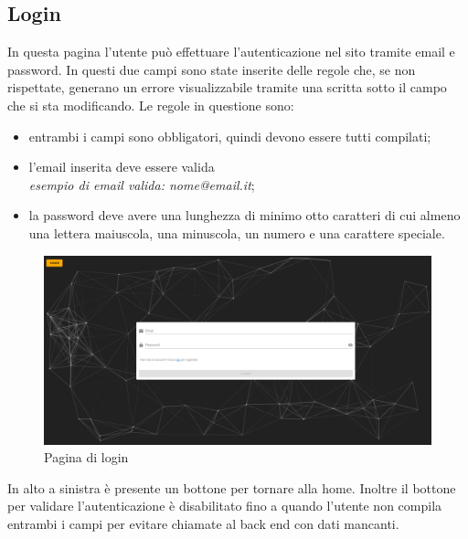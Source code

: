\subsection{Login}
In questa pagina l'utente può effettuare l'autenticazione nel sito tramite email e password. In questi due campi sono state inserite delle regole che, se non rispettate, generano un errore visualizzabile tramite una scritta sotto il campo che si sta modificando. Le regole in questione sono:
\begin{itemize}
	\item entrambi i campi sono obbligatori, quindi devono essere tutti compilati;
	\item l'email inserita deve essere valida\\
	\textit{esempio di email valida: nome@email.it};
	\item la password deve avere una lunghezza di minimo otto caratteri di cui almeno una lettera maiuscola, una minuscola, un numero e una carattere speciale.
\end{itemize}
\begin{figure}[H]
	\begin{center}
		\includegraphics[width=0.7\columnwidth]{immagini/login.png}
		\caption{Pagina di login}
	\end{center}
\end{figure}
In alto a sinistra è presente un bottone per tornare alla home. Inoltre il bottone per validare l'autenticazione è disabilitato fino a quando l'utente non compila entrambi i campi per evitare chiamate al back end con dati mancanti.
